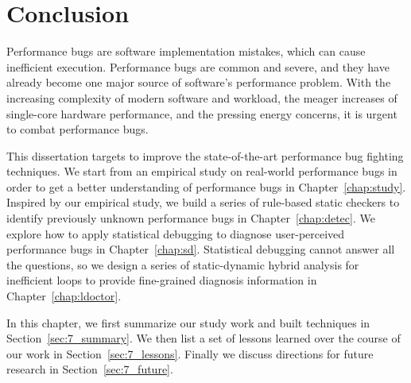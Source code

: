 \chapter[Conclusion]{Conclusion}
\label{chap:con}

Performance bugs are software implementation mistakes, which can cause inefficient execution. 
Performance bugs are common and severe, and they have already become one major source of software's performance problem. 
With the increasing complexity
of modern software and workload, the meager increases of single-core hardware performance, and the pressing energy concerns, 
it is urgent to combat performance bugs. 

This dissertation targets to improve the state-of-the-art performance bug fighting techniques. 
We start from an empirical study on real-world performance bugs in order to get a better understanding of performance bugs in Chapter~\ref{chap:study}.
Inspired by our empirical study, 
we build a series of rule-based static checkers to identify previously unknown performance bugs in Chapter~\ref{chap:detec}. 
We explore how to apply statistical debugging to diagnose user-perceived performance bugs in Chapter~\ref{chap:sd}. 
Statistical debugging cannot answer all the questions, 
so we design a series of static-dynamic hybrid analysis for inefficient 
loops to provide fine-grained diagnosis information in Chapter~\ref{chap:ldoctor}. 

In this chapter, we first summarize our study work and built techniques in Section~\ref{sec:7_summary}. 
We then list a set of lessons learned over the course of our work in Section~\ref{sec:7_lessons}. 
Finally we discuss directions for future research in Section~\ref{sec:7_future}.




